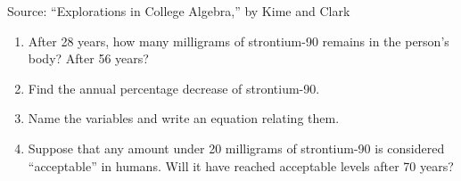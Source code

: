 \begin{enumerate}
\hfill \begin{footnotesize}Source:  ``Explorations in College Algebra,'' by Kime and Clark\end{footnotesize}
\begin{enumerate}
\item After 28 years, how many milligrams of strontium-90 remains in the person's body? After 56 years? 
\vfill
\item Find the annual percentage decrease of strontium-90. 
\vfill
\vfill
\item Name the variables and write an equation relating them. 
\vfill
\vfill
\item Suppose that any amount under 20 milligrams of strontium-90 is considered ``acceptable'' in humans. Will it have reached acceptable levels after 70 years? 
\vfill
\end{enumerate}  


\end{enumerate}




